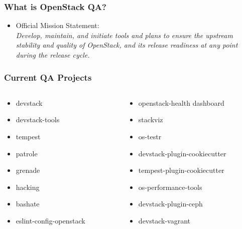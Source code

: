 \documentclass[aspectratio=169,11pt,hyperref={colorlinks=true}]{beamer}
\begin{document}
\begin{frame}
    \frametitle{What is OpenStack QA?}
    \begin{itemize}
     \item Official Mission Statement:\\
         \textit{Develop, maintain, and initiate tools and plans to ensure
the upstream stability and quality of OpenStack, and its release readiness at
any point during the release cycle.}
    \end{itemize}
\end{frame}

\begin{frame}
    \frametitle{Current QA Projects}
    \begin{columns}
    \begin{column}{0.5\textwidth}
    \begin{itemize}
        \item{devstack}
        \item{devstack-tools}
        \item{tempest}
        \item{patrole}
        \item{grenade}
        \item{hacking}
        \item{bashate}
        \item{eslint-config-openstack}
    \end{itemize}
    \end{column}
    \begin{column}{0.5\textwidth}
    \begin{itemize}
        \item{openstack-health dashboard}
        \item{stackviz}
        \item{os-testr}
        \item{devstack-plugin-cookiecutter}
        \item{tempest-plugin-cookiecutter}
        \item{os-performance-tools}
        \item{devstack-plugin-ceph}
        \item{devstack-vagrant}
    \end{itemize}
    \end{column}
    \end{columns}
\end{frame}
\end{document}
